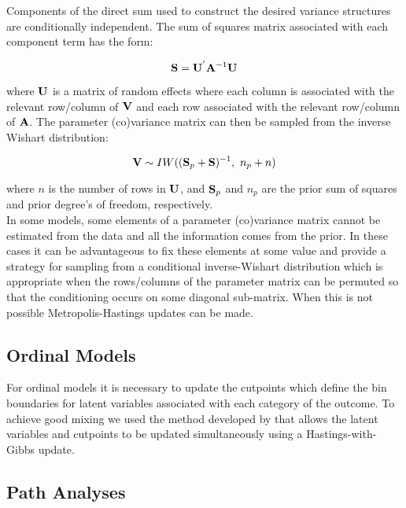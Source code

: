 \documentclass{article}
\begin{document}
Components of the direct sum used to construct the desired variance structures are conditionally independent.  The sum of squares matrix associated with each component term has the form:

\begin{equation}
{\bf S} = {\bf U}^{'}{\bf A}^{-1}{\bf U}
\end{equation}

where ${\bf U}$ is a matrix of random effects where each column is associated with the relevant row/column of ${\bf V}$ and each row associated with the relevant row/column of ${\bf A}$. The parameter (co)variance matrix can then be sampled from the inverse Wishart distribution:


\begin{equation}
{\bf V} \sim IW(({\bf S}_{p}+{\bf S})^{-1},\ n_{p}+n)
\label{pIW-Eq}
\end{equation}

where $n$ is the number of rows in ${\bf U}$, and ${\bf S}_{p}$ and $n_{p}$ are the prior sum of squares and prior degree's of freedom, respectively.\\

In some models, some elements of a parameter (co)variance matrix cannot be estimated from the data and all the information comes from the prior. In these cases it can be advantageous to fix these elements at some value and \citet{Korsgaard.1999} provide a strategy for sampling from a conditional inverse-Wishart distribution which is appropriate when the rows/columns of the parameter matrix can be permuted so that the conditioning occurs on some diagonal sub-matrix. When this is not possible Metropolis-Hastings updates can be made. 

\subsection{Ordinal Models}

For ordinal models it is necessary to update the cutpoints which define the bin boundaries for latent variables associated with each category of the outcome.  To achieve good mixing we used the method developed by \citep{Cowles.1996} that allows the latent variables and cutpoints to be updated simultaneously using a Hastings-with-Gibbs update.

\subsection{Path Analyses}
\end{document}
